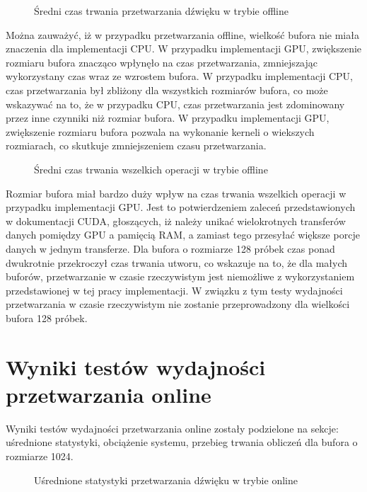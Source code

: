 \begin{figure}[H]
    \centering
    \scalebox{1.0}{}
    \caption{Średni czas trwania przetwarzania dźwięku w trybie offline}
    \label{fig:Średni czas trwania przetwarzania dźwięku w trybie offline}
\end{figure}

Można zauważyć, iż w przypadku przetwarzania offline, wielkość bufora nie miała znaczenia dla implementacji CPU. W przypadku implementacji GPU, zwiększenie rozmiaru bufora znacząco wpłynęło na czas przetwarzania, zmniejszając wykorzystany czas wraz ze wzrostem bufora. W przypadku implementacji CPU, czas przetwarzania był zbliżony dla wszystkich rozmiarów bufora, co może wskazywać na to, że w przypadku CPU, czas przetwarzania jest zdominowany przez inne czynniki niż rozmiar bufora. W przypadku implementacji GPU, zwiększenie rozmiaru bufora pozwala na wykonanie kerneli o wiekszych rozmiarach, co skutkuje zmniejszeniem czasu przetwarzania.

\begin{figure}[H]
    \centering
    \scalebox{1.0}{}
    \caption{Średni czas trwania wszelkich operacji w trybie offline}
    \label{fig:Średni czas trwania wszelkich operacji w trybie offline}
\end{figure}

Rozmiar bufora miał bardzo duży wpływ na czas trwania wszelkich operacji w przypadku implementacji GPU. Jest to potwierdzeniem zaleceń przedstawionych w dokumentacji CUDA, głoszących, iż należy unikać wielokrotnych transferów danych pomiędzy GPU a pamięcią RAM, a zamiast tego przesyłać większe porcje danych w jednym transferze. Dla bufora o rozmiarze 128 próbek czas ponad dwukrotnie przekroczył czas trwania utworu, co wskazuje na to, że dla małych buforów, przetwarzanie w czasie rzeczywistym jest niemożliwe z wykorzystaniem przedstawionej w tej pracy implementacji. W związku z tym testy wydajności przetwarzania w czasie rzeczywistym nie zostanie przeprowadzony dla wielkości bufora 128 próbek.

\section{Wyniki testów wydajności przetwarzania online}
Wyniki testów wydajności przetwarzania online zostały podzielone na sekcje: uśrednione statystyki, obciążenie systemu, przebieg trwania obliczeń dla bufora o rozmiarze 1024.

\begin{figure}[H]
    \centering
    \scalebox{1.0}{}
    \caption{Uśrednione statystyki przetwarzania dźwięku w trybie online}
    \label{fig:Uśrednione statystyki przetwarzania dźwięku w trybie online}
\end{figure}

